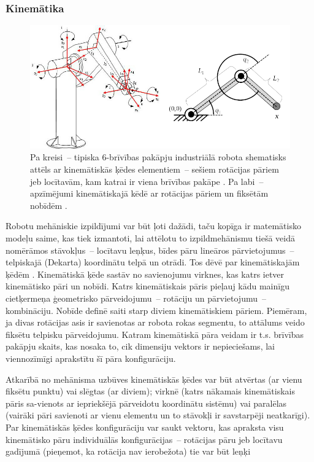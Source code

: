 \documentclass[12pt, a4paper]{article}
\numberwithin{equation}{section} %
\begin{document}
\subsubsection{Kinemātika}

\begin{figure}[t!]
    \centering
    \includegraphics[width=16cm,page=1]{../img/6dof-kinematics.png}
    \caption{Pa kreisi~-- tipiska 6-brīvības pakāpju industriālā robota shematisks attēls ar kinemātiskās ķēdes elementiem~-- sešiem rotācijas pāriem jeb locītavām, kam katrai ir viena brīvības pakāpe \cite{harib2012parallel}. Pa labi~-- apzīmējumi kinemātiskajā kēdē ar rotācijas pāriem un fiksētām nobīdēm \cite{kinematics_illinois}.}
\end{figure}

Robotu mehāniskie izpildījumi var būt ļoti dažādi, taču kopīga ir matemātisko modeļu saime, kas tiek izmantoti, lai attēlotu to izpildmehānismu tiešā veidā nomērāmos stāvokļus~-- locītavu leņķus, bīdes pāru lineāros pārvietojumus~-- telpiskajā (Dekarta) koordinātu telpā un otrādi. Tos dēvē par kinemātiskajām ķēdēm \cite{kinematics_illinois}. Kinemātiskā ķēde sastāv no savienojumu virknes, kas katrs ietver kinemātisko pāri un nobīdi. Katrs kinemātiskais pāris pieļauj kādu mainīgu cietķermeņa ģeometrisko pārveidojumu~-- rotāciju un pārvietojumu~-- kombināciju. Nobīde definē saiti starp diviem kinemātiskiem pāriem. Piemēram, ja divas rotācijas asis ir savienotas ar robota rokas segmentu, to attālums veido fiksētu telpisku pārveidojumu. Katram kinemātiskā pāra veidam ir t.s. brīvības pakāpju skaits, kas nosaka to, cik dimensiju vektors ir nepieciešams, lai viennozīmīgi aprakstītu šī pāra konfigurāciju.

Atkarībā no mehānisma uzbūves kinemātiskās ķēdes var būt atvērtas (ar vienu fiksētu punktu) vai slēgtas (ar diviem); virknē (katrs nākamais kinemātiskais pāris sa-vienots ar iepriekšējā pārveidotu koordinātu sistēmu) vai paralēlas (vairāki pāri savienoti ar vienu elementu un to stāvokļi ir savstarpēji neatkarīgi). Par kinemātiskās ķēdes konfigurāciju var saukt vektoru, kas apraksta visu kinemātisko pāru individuālās konfigurācijas~-- rotācijas pāru jeb locītavu gadījumā (pieņemot, ka rotācija nav ierobežota) tie var būt leņķi
\end{document}
